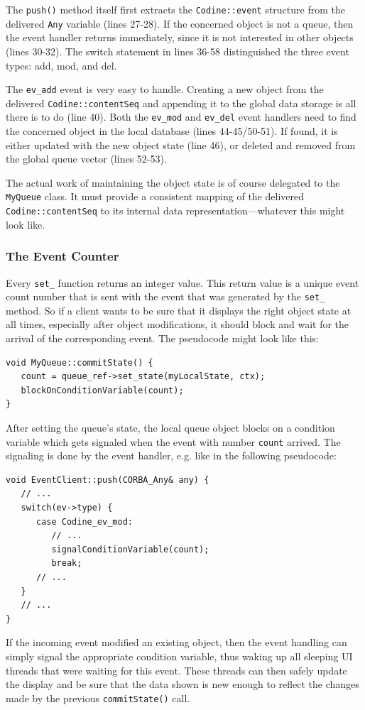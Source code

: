 The \texttt{push()} method itself first extracts the \texttt{Codine::event}
structure from the delivered \texttt{Any} variable (lines 27-28). If the
concerned object is not a queue, then the event handler returns immediately,
since it is not interested in other objects (lines 30-32). The switch
statement in lines 36-58 distinguished the three event types: add, mod, and
del.

The \texttt{ev\_add} event is very easy to handle. Creating a new object from
the delivered \texttt{Codine::contentSeq} and appending it to the global data
storage is all there is to do (line 40). Both the \texttt{ev\_mod} and
\texttt{ev\_del} event handlers need to find the concerned object in the
local database (lines 44-45/50-51). If found, it is either updated with the
new object state (line 46), or deleted and removed from the global queue
vector (lines 52-53).

The actual work of maintaining the object state is of course delegated to the
\texttt{MyQueue} class. It must provide a consistent mapping of the delivered
\texttt{Codine::contentSeq} to its internal data representation---whatever
this might look like.

\subsubsection{The Event Counter}
Every \texttt{set\_} function returns an integer value. This return value is
a unique event count number that is sent with the event that was generated by
the \texttt{set\_} method. So if a client wants to be sure that it displays
the right object state at all times, especially after object modifications,
it should block and wait for the arrival of the corresponding event. The
pseudocode might look like this:

\begin{Verbatim}[fontsize=\small, frame=single]
void MyQueue::commitState() {
   count = queue_ref->set_state(myLocalState, ctx);
   blockOnConditionVariable(count);
}
\end{Verbatim}

After setting the queue's state, the local queue object blocks on a condition
variable which gets signaled when the event with number \texttt{count}
arrived. The signaling is done by the event handler, e.g. like in the
following pseudocode:

\begin{Verbatim}[fontsize=\small, frame=single]
void EventClient::push(CORBA_Any& any) {
   // ...
   switch(ev->type) {
      case Codine_ev_mod:
         // ...
         signalConditionVariable(count);
         break;
      // ...
   }
   // ...
}
\end{Verbatim}

If the incoming event modified an existing object, then the event handling
can simply signal the appropriate condition variable, thus waking up all
sleeping UI threads that were waiting for this event. These threads can then
safely update the display and be sure that the data shown is new enough to
reflect the changes made by the previous \texttt{commitState()} call.
